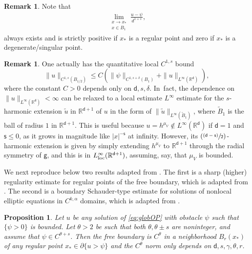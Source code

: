 \documentclass[10pt]{amsart}
\newcommand{\psfrac}[2]{\sfrac{(#1)}{#2}}
\newcommand{\loc}{\textup{loc}}
\theoremstyle{plain}
\newtheorem{prop}[thm]{Proposition}
\theoremstyle{definition}
\newtheorem{remark}[thm]{Remark}
\newcommand{\R}{{\mathbb{R}}}
\let\al\alpha
\let\ga\gamma
\let\p\partial
\let\tl\tilde
\renewcommand{\d}{\mathsf{d}}
\newcommand{\g}{{\mathsf{g}}}
\newcommand{\s}{\mathsf{s}}
\begin{document}
\begin{remark}
Note that
\begin{align*}
\lim_{\substack{x\to x_* \\ x\in B_1}} \frac{u-\psi}{d^{1+s}},
\end{align*}
always exists and is strictly positive if $x_*$ is a regular point and zero if $x_*$ is a degenerate/singular point.
\end{remark}

\begin{remark}\label{rem:OPreg}
One actually has the quantitative local $C^{1,s}$ bound
\begin{equation}\label{eq:OPreg}
\|u\|_{C^{1,s}(B_{1/2})} \le C(\|\psi\|_{C^{1,s+\delta}(B_1)} + \|u\|_{L^\infty(\R^\d)}),
\end{equation}
where the constant $C>0$ depends only on $\d,s,\delta$. In~fact, the dependence on $\|u\|_{L^\infty(\R^\d)}<\infty$ can be relaxed to a local estimate $L^\infty$ estimate for the $s$-harmonic extension $\tl{u}$ in $\R^{\d+1}$ of $u$ in the form of $\|\tl{u}\|_{L^\infty(\tl{B}_1)}$, where $\tl{B}_1$ is the ball of radius $1$ in $\R^{\d+1}$. This is useful because $u=h^{\mu_V}\notin L^\infty(\R^\d)$ if $\d=1$ and $\s\le 0$, as it grows in magnitude like $|x|^{-\s}$ at infinity. However, its $(\psfrac{\d-\s}{2})$-harmonic extension is given by simply extending $h^{\mu_V}$ to $\R^{\d+1}$ through the radial symmetry of $\g$, and this is in $L_{\loc}^\infty(\R^{\d+1})$, assuming, say, that $\mu_V$ is bounded.
\end{remark}

We next reproduce below two results adapted from \cite{ArO2020}. The first is a sharp (higher) regularity estimate for regular points of the free boundary, which is adapted from \cite[Th.\,1.2]{ArO2020}. The second is a boundary Schauder-type estimate for solutions of nonlocal elliptic equations in $C^{k,\al}$ domains, which is adapted from \cite[Th.\,1.4]{ArO2020}.

\begin{prop}\label{lem:ArO1}
Let $u$ be any solution of \eqref{eq:globOP} with obstacle $\psi$ such that $\{\psi>0\}$ is bounded. Let $\theta>2$ be such that both $\theta,\theta\pm s$ are noninteger, and assume that $\psi \in C^{\theta+s}$. Then the free boundary is $C^\theta$ in a neighborhood $B_r(x_*)$ of any regular point $x_* \in \p\{u>\psi\}$ and the $C^\theta$ norm only depends on $\d,s,\ga,\theta,r$.
\end{prop}
\end{document}

